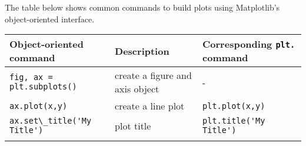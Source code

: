 \documentclass{book}
\newcommand{\passthrough}[1]{#1}
\begin{document}
    
        The table below shows common commands to build plots using Matplotlib's
object-oriented interface.

\begin{longtable}[]{@{}lll@{}}
\toprule
\begin{minipage}[b]{0.30\columnwidth}\raggedright
Object-oriented command\strut
\end{minipage} & \begin{minipage}[b]{0.30\columnwidth}\raggedright
Description\strut
\end{minipage} & \begin{minipage}[b]{0.30\columnwidth}\raggedright
Corresponding \passthrough{\lstinline!plt.!} command\strut
\end{minipage}\tabularnewline
\midrule
\endhead
\begin{minipage}[t]{0.30\columnwidth}\raggedright
\passthrough{\lstinline!fig, ax = plt.subplots()!}\strut
\end{minipage} & \begin{minipage}[t]{0.30\columnwidth}\raggedright
create a figure and axis object\strut
\end{minipage} & \begin{minipage}[t]{0.30\columnwidth}\raggedright
-\strut
\end{minipage}\tabularnewline
\begin{minipage}[t]{0.30\columnwidth}\raggedright
\passthrough{\lstinline!ax.plot(x,y)!}\strut
\end{minipage} & \begin{minipage}[t]{0.30\columnwidth}\raggedright
create a line plot\strut
\end{minipage} & \begin{minipage}[t]{0.30\columnwidth}\raggedright
\passthrough{\lstinline!plt.plot(x,y)!}\strut
\end{minipage}\tabularnewline
\begin{minipage}[t]{0.30\columnwidth}\raggedright
\passthrough{\lstinline!ax.set\_title('My Title')!}\strut
\end{minipage} & \begin{minipage}[t]{0.30\columnwidth}\raggedright
plot title\strut
\end{minipage} & \begin{minipage}[t]{0.30\columnwidth}\raggedright
\passthrough{\lstinline!plt.title('My Title')!}\strut
\end{minipage}\tabularnewline
\begin{minipage}[t]{0.30\columnwidth}\raggedright

\end{minipage}
\end{longtable}
\end{document}
